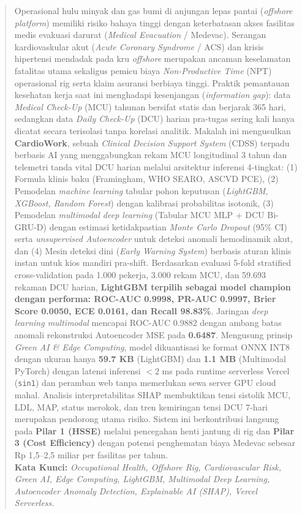 \documentclass[a4paper,11pt]{article}
\begin{document}
\begin{abstract}
\noindent Operasional hulu minyak dan gas bumi di anjungan lepas pantai (\textit{offshore platform}) memiliki risiko bahaya tinggi dengan keterbatasan akses fasilitas medis evakuasi darurat (\textit{Medical Evacuation} / Medevac). Serangan kardiovaskular akut (\textit{Acute Coronary Syndrome} / ACS) dan krisis hipertensi mendadak pada kru \textit{offshore} merupakan ancaman keselamatan fatalitas utama sekaligus pemicu biaya \textit{Non-Productive Time} (NPT) operasional rig serta klaim asuransi berbiaya tinggi. Praktik pemantauan kesehatan kerja saat ini menghadapi kesenjangan (\textit{information gap}): data \textit{Medical Check-Up} (MCU) tahunan bersifat statis dan berjarak 365 hari, sedangkan data \textit{Daily Check-Up} (DCU) harian pra-tugas sering kali hanya dicatat secara terisolasi tanpa korelasi analitik. Makalah ini mengusulkan \textbf{CardioWork}, sebuah \textit{Clinical Decision Support System} (CDSS) terpadu berbasis AI yang menggabungkan rekam MCU longitudinal 3 tahun dan telemetri tanda vital DCU harian melalui arsitektur inferensi 4-tingkat: (1) Formula klinis baku (Framingham, WHO SEARO, ASCVD PCE), (2) Pemodelan \textit{machine learning} tabular pohon keputusan (\textit{LightGBM, XGBoost, Random Forest}) dengan kalibrasi probabilitas isotonik, (3) Pemodelan \textit{multimodal deep learning} (Tabular MCU MLP + DCU Bi-GRU-D) dengan estimasi ketidakpastian \textit{Monte Carlo Dropout} (95\% CI) serta \textit{unsupervised Autoencoder} untuk deteksi anomali hemodinamik akut, dan (4) Mesin deteksi dini (\textit{Early Warning System}) berbasis aturan klinis instan untuk kios mandiri pra-shift. Berdasarkan evaluasi 5-fold stratified cross-validation pada 1.000 pekerja, 3.000 rekam MCU, dan 59.693 rekaman DCU harian, \textbf{LightGBM terpilih sebagai model champion dengan performa: ROC-AUC 0.9998, PR-AUC 0.9997, Brier Score 0.0050, ECE 0.0161, dan Recall 98.83\%}. Jaringan \textit{deep learning multimodal} mencapai ROC-AUC 0.9882 dengan ambang batas anomali rekonstruksi Autoencoder MSE pada \textbf{0.6487}. Mengusung prinsip \textit{Green AI \& Edge Computing}, model dikuantisasi ke format ONNX INT8 dengan ukuran hanya \textbf{59.7 KB} (LightGBM) dan \textbf{1.1 MB} (Multimodal PyTorch) dengan latensi inferensi $< 2$ ms pada runtime serverless Vercel (\texttt{sin1}) dan peramban web tanpa memerlukan sewa server GPU cloud mahal. Analisis interpretabilitas SHAP membuktikan tensi sistolik MCU, LDL, MAP, status merokok, dan tren kemiringan tensi DCU 7-hari merupakan pendorong utama risiko. Sistem ini berkontribusi langsung pada \textbf{Pilar 1 (HSSE)} melalui pencegahan henti jantung di rig dan \textbf{Pilar 3 (Cost Efficiency)} dengan potensi penghematan biaya Medevac sebesar Rp 1,5--2,5 miliar per fasilitas per tahun.
\\[0.5em]
\noindent\textbf{Kata Kunci:} \textit{Occupational Health, Offshore Rig, Cardiovascular Risk, Green AI, Edge Computing, LightGBM, Multimodal Deep Learning, Autoencoder Anomaly Detection, Explainable AI (SHAP), Vercel Serverless.}
\end{abstract}
\end{document}

